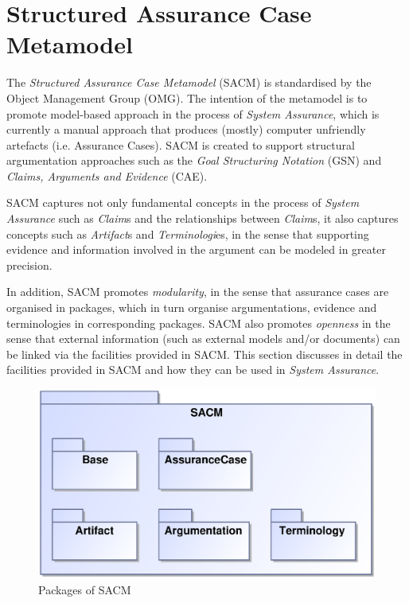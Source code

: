 \section{Structured Assurance Case Metamodel}
\label{sec:sec2}
The \textit{Structured Assurance Case Metamodel} (SACM) is standardised by the Object Management Group (OMG). The intention of the metamodel is to promote model-based approach in the process of \textit{System Assurance}, which is currently a manual approach that produces (mostly) computer unfriendly  artefacts (i.e. Assurance Cases). SACM is created to support structural argumentation approaches such as the \textit{Goal Structuring Notation} (GSN) and \textit{Claims, Arguments and Evidence} (CAE). 

SACM captures not only fundamental concepts in the process of \textit{System Assurance} such as \textit{Claim}s and the relationships between \textit{Claim}s, it also captures concepts such as \textit{Artifact}s and \textit{Terminologi}es, in the sense that supporting evidence and information involved in the argument can be modeled in greater precision. 

In addition, SACM promotes \textit{modularity}, in the sense that assurance cases are organised in packages, which in turn organise argumentations, evidence and terminologies in corresponding packages. SACM also promotes \textit{openness} in the sense that external information (such as external models and/or documents) can be linked via the facilities provided in SACM. This section discusses in detail the facilities provided in SACM and how they can be used in \textit{System Assurance}.

\begin{figure}
	\centering
	\includegraphics[width=0.6\linewidth]{fig/Overview.eps}
	\caption{Packages of SACM}
	\label{fig:overview}
\end{figure}

